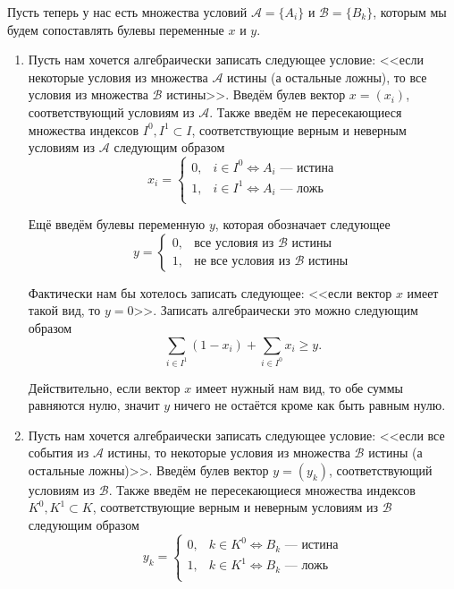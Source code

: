 \label{fact:complex_conditions}

Пусть теперь у нас есть множества условий $\mathcal{A} = \{A_i\}$ и $\mathcal{B} = \{B_k\}$, которым мы будем сопоставлять булевы переменные $x$ и $y$.

\begin{enumerate}[nosep]
	\item Пусть нам хочется алгебраически записать следующее условие: <<если некоторые условия из множества $\mathcal{A}$ истины (а остальные ложны), то все условия из множества $\mathcal{B}$ истины>>. Введём булев вектор $x = (x_i)$, соответствующий условиям из $\mathcal{A}$. Также введём не пересекающиеся множества индексов $I^0, I^1 \subset I$, соответствующие верным и неверным условиям из $\mathcal{A}$ следующим образом
	\[
		x_i = \begin{cases}
			0,& i \in I^0 \Leftrightarrow \text{$A_i$ --- истина}\\
			1,& i \in I^1 \Leftrightarrow \text{$A_i$ --- ложь}\\
		\end{cases}
	\]
	
	Ещё введём булевы переменную $y$, которая обозначает следующее
	\[
		y = \begin{cases}
			0, &\text{все условия из $\mathcal{B}$ истины} \\
			1, &\text{не все условия из $\mathcal{B}$ истины}
		\end{cases}
	\]
	
	Фактически нам бы хотелось записать следующее: <<если вектор $x$ имеет такой вид, то $y = 0$>>. Записать алгебраически это можно следующим образом
	\[
		\sum_{i \in I^1}(1-x_i) + \sum_{i \in I^0}x_i \ge y.
	\]
	
	Действительно, если вектор $x$ имеет нужный нам вид, то обе суммы равняются нулю, значит $y$ ничего не остаётся кроме как быть равным нулю.
	
	\item  Пусть нам хочется алгебраически записать следующее условие: <<если все события из $\mathcal{A}$ истины, то некоторые условия из множества $\mathcal{B}$ истины (а остальные ложны)>>. Введём булев вектор $y = (y_k)$, соответствующий условиям из $\mathcal{B}$. Также введём не пересекающиеся множества индексов $K^0, K^1 \subset K$, соответствующие верным и неверным условиям из $\mathcal{B}$ следующим образом
	\[
		y_k = \begin{cases}
			0,& k \in K^0 \Leftrightarrow \text{$B_k$ --- истина}\\
			1,& k \in K^1 \Leftrightarrow \text{$B_k$ --- ложь}\\
		\end{cases}
	\]
	

\end{enumerate}
